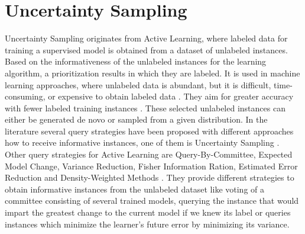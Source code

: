 \section{Uncertainty Sampling} \label{sec:uncertaintysampling}
Uncertainty Sampling originates from Active Learning, 
where labeled data for training a supervised model is obtained from a dataset of unlabeled instances.
Based on the informativeness of the unlabeled instances for the learning algorithm, a prioritization results in which they are labeled.
It is used in machine learning approaches, where unlabeled data is abundant, but it is difficult, time-consuming, or expensive to obtain labeled data \cite{Settles2009ActiveLL}.
They aim for greater accuracy with fewer labeled training instances \cite{Settles2009ActiveLL}.
These selected unlabeled instances can either be generated de novo or sampled from a given distribution.
In the literature several query strategies have been proposed with different approaches how to receive informative instances, one of them is Uncertainty Sampling \cite{Settles2009ActiveLL}.
Other query strategies for Active Learning are Query-By-Committee, Expected Model Change, Variance Reduction, Fisher Information Ration, Estimated Error Reduction and Density-Weighted Methods \cite{Settles2009ActiveLL}.
They provide different strategies to obtain informative instances from the unlabeled dataset like voting of a committee consisting of several trained models, querying the instance that would impart the greatest change to the current model if we knew its label or queries instances which minimize the learner’s future error by minimizing its variance.

